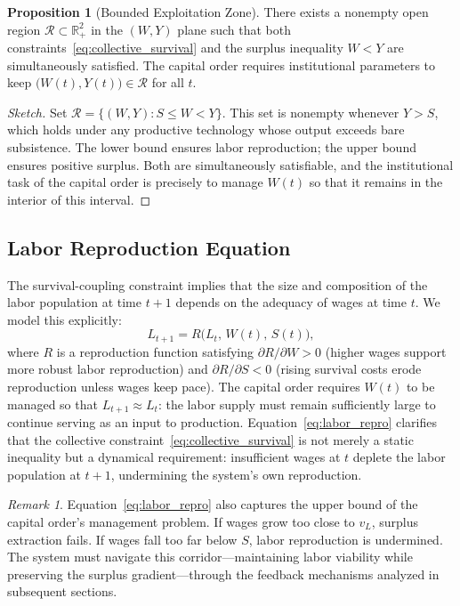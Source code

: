 \documentclass[12pt,a4paper]{article}
\theoremstyle{definition}
\newtheorem{proposition}{Proposition}[section]
\theoremstyle{remark}
\newtheorem{remark}{Remark}[section]
\begin{document}
\begin{proposition}[Bounded Exploitation Zone]
There exists a nonempty open region $\mathcal{R} \subset \mathbb{R}^2_+$ in the $(W, Y)$ plane such that both constraints~\eqref{eq:collective_survival} and the surplus inequality $W < Y$ are simultaneously satisfied. The capital order requires institutional parameters to keep $\bigl(W(t), Y(t)\bigr) \in \mathcal{R}$ for all $t$.
\end{proposition}

\begin{proof}[Sketch]
Set $\mathcal{R} = \{(W,Y) : S \leq W < Y\}$. This set is nonempty whenever $Y > S$, which holds under any productive technology whose output exceeds bare subsistence. The lower bound ensures labor reproduction; the upper bound ensures positive surplus. Both are simultaneously satisfiable, and the institutional task of the capital order is precisely to manage $W(t)$ so that it remains in the interior of this interval.
\end{proof}

\subsection{Labor Reproduction Equation}

The survival-coupling constraint implies that the size and composition of the labor population at time $t+1$ depends on the adequacy of wages at time $t$. We model this explicitly:
\begin{equation}
  \label{eq:labor_repro}
  L_{t+1} = R\!\bigl(L_t,\, W(t),\, S(t)\bigr),
\end{equation}
where $R$ is a reproduction function satisfying $\partial R / \partial W > 0$ (higher wages support more robust labor reproduction) and $\partial R / \partial S < 0$ (rising survival costs erode reproduction unless wages keep pace). The capital order requires $W(t)$ to be managed so that $L_{t+1} \approx L_t$: the labor supply must remain sufficiently large to continue serving as an input to production. Equation~\eqref{eq:labor_repro} clarifies that the collective constraint~\eqref{eq:collective_survival} is not merely a static inequality but a dynamical requirement: insufficient wages at $t$ deplete the labor population at $t+1$, undermining the system's own reproduction.

\begin{remark}
Equation~\eqref{eq:labor_repro} also captures the upper bound of the capital order's management problem. If wages grow too close to $v_L$, surplus extraction fails. If wages fall too far below $S$, labor reproduction is undermined. The system must navigate this corridor---maintaining labor viability while preserving the surplus gradient---through the feedback mechanisms analyzed in subsequent sections.
\end{remark}
\end{document}
